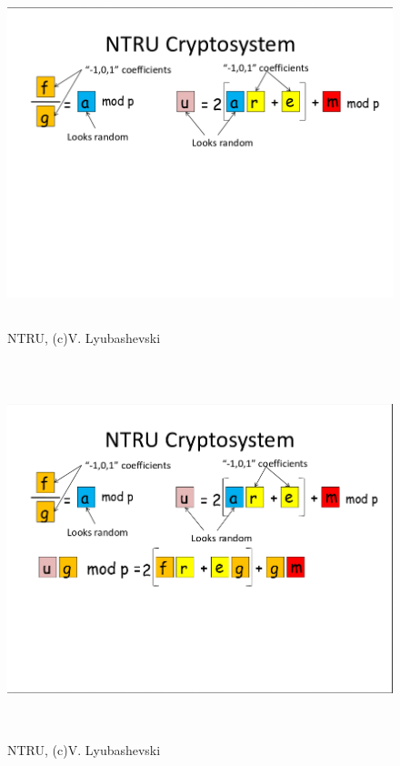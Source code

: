 \documentclass{beamer}
\begin{document}
\begin{frame}
    \begin{figure}
            \includegraphics[width=12cm,height=10cm,keepaspectratio]{img/vadim2.png}
            \caption{NTRU, (c)V. Lyubashevski}
        \end{figure}
\end{frame}

\begin{frame}
    \begin{figure}
            \includegraphics[width=12cm,height=11cm,keepaspectratio]{img/vadim3.png}
            \caption{NTRU, (c)V. Lyubashevski}
        \end{figure}
\end{frame}
\end{document}
